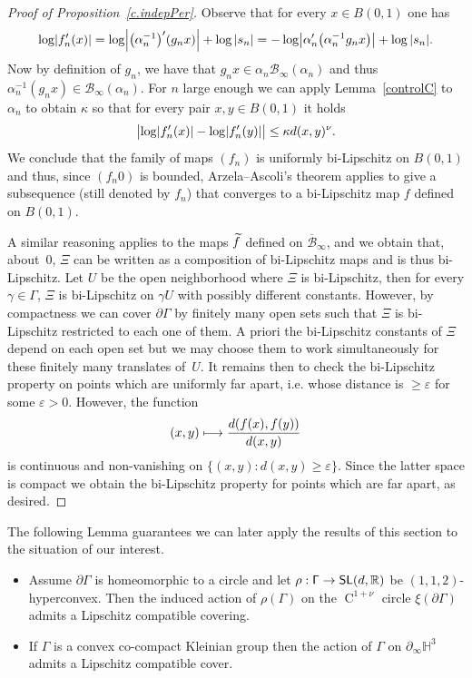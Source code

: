 \documentclass[AHL,Unicode,longabstracts,MathTools]{cedram}
\DeclareMathOperator{\class}{C}
\DeclareMathOperator{\SL}{{\mathsf{SL}}}
\renewcommand{\sf}[1]{{\mathsf{#1}}}
\newcommand{\G}{\sf{\Gamma}}
\newcommand{\cal}{\mathcal}
\newcommand{\R}{\mathbb{R}}
\renewcommand{\H}{\mathbb{H}}
\newcommand{\eps}{\varepsilon}
\newcommand{\g}{\gamma}
\newcommand{\bord}{\partial}
\newcommand{\ov}{\overline}
\renewcommand{\/}{\backslash}
\newcommand{\<}{\langle}
\renewcommand{\>}{\rangle}
\renewcommand*{\to}{\mathchoice{\longrightarrow}{\rightarrow}{\rightarrow}{\rightarrow}}
\let\oldmapsto\mapsto
\renewcommand*{\mapsto}{\mathchoice{\longmapsto}{\oldmapsto}{\oldmapsto}{\oldmapsto}}
\let\originalleft\left
\let\originalright\right
\renewcommand{\left}{\mathopen{}\mathclose\bgroup\originalleft}
\renewcommand{\right}{\aftergroup\egroup\originalright}
\let\oldtilde\tilde
\renewcommand*{\tilde}[1]{\mathchoice{\widetilde{#1}}{\widetilde{#1}}{\oldtilde{#1}}{\oldtilde{#1}}}
\begin{document}
\begin{proof}[Proof of Proposition~\ref{c.indepPer}]
Observe that for every $x\in B(0,1)$ one has
\[
\log\left|f_n'(x)\right|=\log\left|\left(\alpha_n^{-1}\right)'(g_nx)\right|+\log|s_n|= -\log\left|\alpha_n'\left(\alpha_n^{-1}g_nx\right)\right|+\log|s_n|.
\]
Now by definition of $g_n$, we have that $g_nx \in\alpha_n\cal B_\infty(\alpha_n)$ and thus $\alpha_n^{-1}(g_nx)\in\cal B_\infty(\alpha_n)$. For $n$ large enough we can apply Lemma~\ref{controlC} to $\alpha_n$ to obtain $\kappa$ so that for every pair $x,y\in B(0,1)$ it holds
\[
\bigl\lvert\log\left|f_n'(x)\right|-\log\left|f_n'(y)\right|\bigr|\leq \kappa d(x,y)^\nu.
\]
We conclude that the family of maps $(f_n)$ is uniformly bi-Lipschitz on $B(0,1)$ and thus, since $(f_n0)$ is bounded, Arzela--Ascoli's theorem applies to give a subsequence (still denoted by $f_n$) that converges to a bi-Lipschitz map $f$ defined on $B(0,1)$.


A similar reasoning applies to the maps $\tilde f$ defined on $\ov{\cal B}_\infty$, and we obtain that, about~$0$, $\Xi$ can be written as a composition of bi-Lipschitz maps and is thus bi-Lipschitz. Let $U$ be the open neighborhood where $\Xi$ is bi-Lipschitz, then for every $\g\in\G$, $\Xi$ is bi-Lipschitz on $\g U$ with possibly different constants. However, by compactness we can cover $\bord\G$ by finitely many open sets such that $\Xi$ is bi-Lipschitz restricted to each one of them. A priori the bi-Lipschitz constants of $\Xi$ depend on each open set but we may choose them to work simultaneously for these finitely many translates of~$U$. It remains then to check the bi-Lipschitz property on points which are uniformly far apart, i.e. whose distance is $\geq\eps$ for some $\eps>0$. However, the function
\[
(x,y)\mapsto \frac{d(f(x),f(y))}{d(x,y)}
\]
is continuous and non-vanishing on $\{(x,y):d(x,y)\geq\eps\}$. Since the latter space is compact we obtain the bi-Lipschitz property for points which are far apart, as desired.
\end{proof}


The following Lemma guarantees we can later apply the results of this section to the situation of our interest.


\begin{lemm}\label{usar}
\leavevmode
\begin{itemize}
\item Assume $\bord\G$ is homeomorphic to a circle and let $\rho:\G\to\SL(d,\R)$ be $(1,1,2)$-hyperconvex. Then the induced action of $\rho(\G)$ on the $\class^{1+\nu}$ circle $\xi(\bord\G)$ admits a Lipschitz compatible covering.
\item If $\G$ is a convex co-compact Kleinian group then the action of $\G$ on $\bord_\infty\H^3$ admits a Lipschitz compatible cover.
\end{itemize}
\end{lemm}
\end{document}

